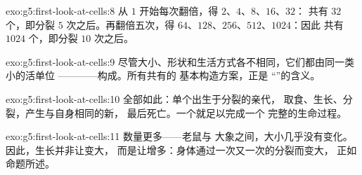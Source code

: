\begin{solution}{exo:g5:first-look-at-cells:8}
从 $1$ 开始每次翻倍，得 $2$、$4$、$8$、$16$、$32$：
共有 $32$ 个，即分裂 $5$ 次之后。再翻倍五次，得
$64$、$128$、$256$、$512$、$1024$：因此
共有 $1024$ 个，即分裂 $10$ 次之后。
\end{solution}

\begin{solution}{exo:g5:first-look-at-cells:9}
尽管大小、形状和生活方式各不相同，它们都由同一类小的活单位
————构成。所有共有的
基本构造方案，正是
“”的含义。
\end{solution}

\begin{solution}{exo:g5:first-look-at-cells:10}
全部如此：单个出生于分裂的亲代，
取食、生长、分裂，产生与自身相同的新，
最后死亡。一个就足以完成一个
完整的生命过程。
\end{solution}

\begin{solution}{exo:g5:first-look-at-cells:11}
数量更多——老鼠与
大象之间，大小几乎没有变化。因此，生长并非让变大，
而是让增多：身体通过一次又一次的分裂而变大，
正如命题所述。
\end{solution}
